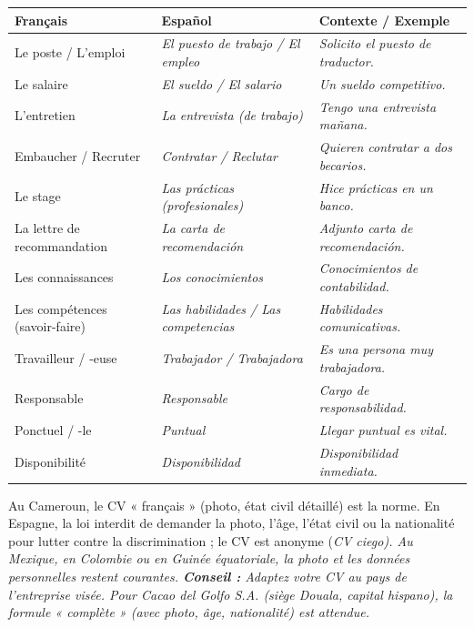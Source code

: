 \documentclass[11pt]{article}
\newcommand{\esp}[1]{\ifmmode\text{\textit{#1}}\else\begingroup\selectlanguage{spanish}\itshape #1\endgroup\fi}
\begin{document}
\begin{definition}
\begin{center}
\begin{tabularx}{\linewidth}{|X|X|X|}
\hline
\rowcolor{popgreenL} \textbf{Français} & \textbf{Español} & \textbf{Contexte / Exemple} \\
\hline
Le poste / L'emploi & \esp{El puesto de trabajo / El empleo} & \esp{Solicito el puesto de traductor.} \\
Le salaire & \esp{El sueldo / El salario} & \esp{Un sueldo competitivo.} \\
L'entretien & \esp{La entrevista (de trabajo)} & \esp{Tengo una entrevista mañana.} \\
Embaucher / Recruter & \esp{Contratar / Reclutar} & \esp{Quieren contratar a dos becarios.} \\
Le stage & \esp{Las prácticas (profesionales)} & \esp{Hice prácticas en un banco.} \\
La lettre de recommandation & \esp{La carta de recomendación} & \esp{Adjunto carta de recomendación.} \\
Les connaissances & \esp{Los conocimientos} & \esp{Conocimientos de contabilidad.} \\
Les compétences (savoir-faire) & \esp{Las habilidades / Las competencias} & \esp{Habilidades comunicativas.} \\
Travailleur / -euse & \esp{Trabajador / Trabajadora} & \esp{Es una persona muy trabajadora.} \\
Responsable & \esp{Responsable} & \esp{Cargo de responsabilidad.} \\
Ponctuel / -le & \esp{Puntual} & \esp{Llegar puntual es vital.} \\
Disponibilité & \esp{Disponibilidad} & \esp{Disponibilidad inmediata.} \\
\hline
\end{tabularx}
\end{center}
\end{definition}

\begin{savaistu}
Au Cameroun, le CV « français » (photo, état civil détaillé) est la norme. En Espagne, la loi interdit de demander la photo, l'âge, l'état civil ou la nationalité pour lutter contre la discrimination ; le CV est anonyme (\esp{CV ciego}). Au Mexique, en Colombie ou en Guinée équatoriale, la photo et les données personnelles restent courantes. \textbf{Conseil :} Adaptez votre CV au pays de l'entreprise visée. Pour \emph{Cacao del Golfo S.A.} (siège Douala, capital hispano), la formule « complète » (avec photo, âge, nationalité) est attendue.
\end{savaistu}
\end{document}
